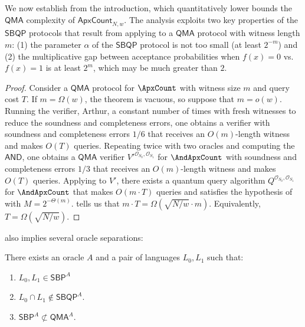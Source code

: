 We now establish  from the introduction,
which quantitatively 
lower bounds the $\mathsf{QMA}$ complexity of $\mathsf{ApxCount}_{N,w}$. 
The analysis exploits
two key properties of the $\mathsf{SBQP}$ protocols that result
from applying  to 
a $\mathsf{QMA}$ protocol with witness length $m$: 
(1) the 
parameter $\alpha$ of the $\mathsf{SBQP}$
protocol is not too small (at least $2^{-m}$)
and (2) the multiplicative gap between acceptance probabilities when $f(x)=0$
vs. $f(x)=1$ is at least $2^m$, which may be much greater than $2$.

\qmabound*

\begin{proof}
Consider a $\mathsf{QMA}$
protocol for $\ApxCount$ with witness size $m$ and query cost $T$. If $m=\Omega(w)$, the theorem is vacuous, so suppose
that $m=o(w)$. Running the verifier, Arthur, a constant number of times with fresh witnesses to reduce the soundness and completeness errors, one obtains a verifier with soundness and completeness errors $1/6$ that receives an $O(m)$-length witness and makes $O(T)$ queries. 
Repeating twice with two oracles and computing the $\mathsf{AND}$, one obtains a $\mathsf{QMA}$ verifier $V'^{\mathcal{O}_{S_0},\mathcal{O}_{S_1}}$ for $\AndApxCount$ with soundness and completeness errors $1/3$ that receives an $O(m)$-length witness and makes $O(T)$ queries. 
Applying  to $V'$, there exists a quantum query algorithm $Q^{\mathcal{O}_{S_0},\mathcal{O}_{S_1}}$ for $\AndApxCount$ that makes $O(m \cdot T)$ queries and satisfies the hypothesis of  with $M=2^{-\Theta(m)}$.  tells us that $m \cdot T = \Omega\left(\sqrt{N/w} \cdot m\right)$.
Equivalently, $T = \Omega\left(\sqrt{N/w}\right)$.
\end{proof}

 also implies several oracle separations:

\begin{corollary}
\label{cor:qma_separation} There exists an oracle $A$ and a pair of
languages $L_0, L_1$ such that:

\begin{enumerate}
\item $L_0, L_1 \in \mathsf{SBP}^A$

\item $L_0 \cap L_1 \not\in \mathsf{SBQP}^A$.

\item $\mathsf{SBP}^A \not\subset \mathsf{QMA}^A$.
\end{enumerate}
\end{corollary}

